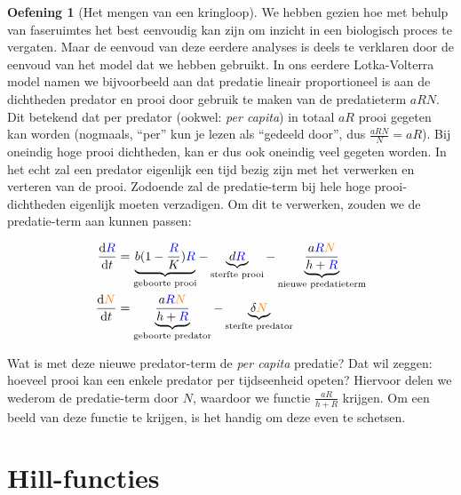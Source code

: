 \documentclass[
  a4paper,
]{scrbook}
\theoremstyle{definition}
\newtheorem{exercise}{Oefening}[chapter]
\theoremstyle{remark}
\begin{document}
\begin{exercise}[Het mengen van een
kringloop]
We hebben gezien hoe met behulp van faseruimtes het best eenvoudig kan
zijn om inzicht in een biologisch proces te vergaten. Maar de eenvoud
van deze eerdere analyses is deels te verklaren door de eenvoud van het
model dat we hebben gebruikt. In ons eerdere Lotka-Volterra model namen
we bijvoorbeeld aan dat predatie lineair proportioneel is aan de
dichtheden predator en prooi door gebruik te maken van de predatieterm
\(aRN\). Dit betekend dat per predator (ookwel: \emph{per capita}) in
totaal \(aR\) prooi gegeten kan worden (nogmaals, ``per'' kun je lezen
als ``gedeeld door'', dus \(\frac{aRN}{N} = aR\)). Bij oneindig hoge
prooi dichtheden, kan er dus ook oneindig veel gegeten worden. In het
echt zal een predator eigenlijk een tijd bezig zijn met het verwerken en
verteren van de prooi. Zodoende zal de predatie-term bij hele hoge
prooi-dichtheden eigenlijk moeten verzadigen. Om dit te verwerken,
zouden we de predatie-term aan kunnen passen:

\begin{align*}
\frac{\mathrm{d}\color{blue}R}{\mathrm{d}t} &= \underbrace{b(1-\frac{\color{blue}R}{K})\color{blue}R}_{\text{geboorte prooi}} - \underbrace{d\color{blue}R}_{\text{sterfte prooi}} - \underbrace{\frac{\color{black}a\color{blue}R\color{orange}N}{h+\color{blue}R\color{black}}}_{\text{nieuwe predatieterm}}\\
\color{black}\frac{\mathrm{d}\color{orange}N}{\mathrm{d}t} &\color{black}= \underbrace{\frac{\color{black}a\color{blue}R\color{orange}N}{h+\color{blue}R\color{black}}}_{\text{geboorte predator}} - \underbrace{\delta \color{orange}N}_{\text{sterfte predator}}
\end{align*}

Wat is met deze nieuwe predator-term de \emph{per capita} predatie? Dat
wil zeggen: hoeveel prooi kan een enkele predator per tijdseenheid
opeten? Hiervoor delen we wederom de predatie-term door \(N\), waardoor
we functie \(\frac{aR}{h+R}\) krijgen. Om een beeld van deze functie te
krijgen, is het handig om deze even te schetsen.

\section{Hill-functies}\label{hill-functies}


\end{exercise}
\end{document}
